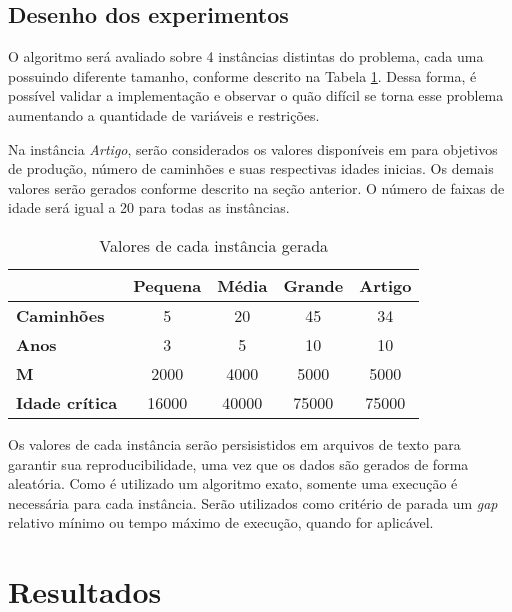 \documentclass[conference]{IEEEtran}
\begin{document}
\subsection{Desenho dos experimentos}

O algoritmo será avaliado sobre 4 instâncias distintas do problema, cada uma possuindo diferente tamanho, conforme descrito na Tabela \ref{tab:instances}. Dessa forma, é possível validar a implementação e observar o quão difícil se torna esse problema aumentando a quantidade de variáveis e restrições.

Na instância \textit{Artigo}, serão considerados os valores disponíveis em \cite{topal2010a} para objetivos de produção, número de caminhões e suas respectivas idades inicias. Os demais valores serão gerados conforme descrito na seção anterior. O número de faixas de idade será igual a 20 para todas as instâncias.

\begin{table}[h!]
	\caption{Valores de cada instância gerada}
	\label{tab:instances}
	\centering
	\begin{tabular}{l|c|c|c|c|}
		\cline{2-5}
		& \textbf{Pequena} & \textbf{Média} & \textbf{Grande} & \textbf{Artigo} \\ \hline
		\multicolumn{1}{|l|}{\textbf{Caminhões}} & 5                & 20             & 45              & 34              \\ \hline
		\multicolumn{1}{|l|}{\textbf{Anos}}      & 3                & 5              & 10              & 10              \\ \hline
		\multicolumn{1}{|l|}{\textbf{M}}         & 2000             & 4000           & 5000            & 5000            \\ \hline
		\multicolumn{1}{|l|}{\textbf{Idade crítica}}         & 16000             & 40000           & 75000            & 	75000            \\ \hline
	\end{tabular}
\end{table}

Os valores de cada instância serão persisistidos em arquivos de texto para garantir sua reproducibilidade, uma vez que os dados são gerados de forma aleatória. Como é utilizado um algoritmo exato, somente uma execução é necessária para cada instância. Serão utilizados como critério de parada um \textit{gap} relativo mínimo ou tempo máximo de execução, quando for aplicável.

\section{Resultados}
\end{document}
